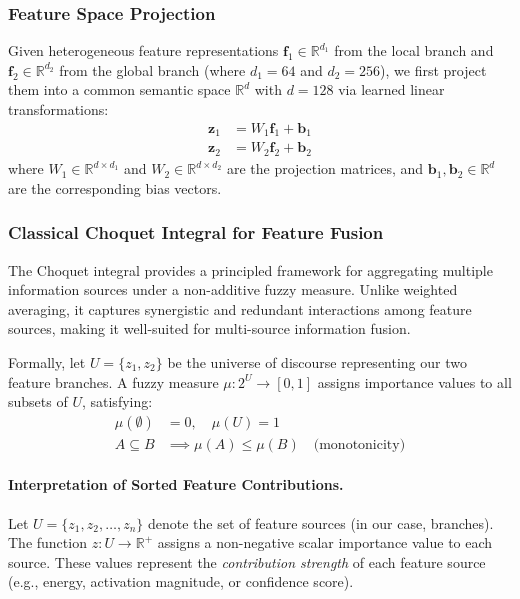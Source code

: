 \documentclass[preprint,12pt]{elsarticle}
\begin{document}
\subsubsection{Feature Space Projection}

Given heterogeneous feature representations $\mathbf{f}_1 \in \mathbb{R}^{d_1}$ from the local branch and $\mathbf{f}_2 \in \mathbb{R}^{d_2}$ from the global branch (where $d_1 = 64$ and $d_2 = 256$), we first project them into a common semantic space $\mathbb{R}^d$ with $d = 128$ via learned linear transformations:
\begin{align*}
    \mathbf{z}_1 &= W_1 \mathbf{f}_1 + \mathbf{b}_1 \\
    \mathbf{z}_2 &= W_2 \mathbf{f}_2 + \mathbf{b}_2
\end{align*}
where $W_1 \in \mathbb{R}^{d \times d_1}$ and $W_2 \in \mathbb{R}^{d \times d_2}$ are the projection matrices, and $\mathbf{b}_1, \mathbf{b}_2 \in \mathbb{R}^d$ are the corresponding bias vectors.

\subsubsection{Classical Choquet Integral for Feature Fusion}

The Choquet integral provides a principled framework for aggregating multiple information sources under a non-additive fuzzy measure. Unlike weighted averaging, it captures synergistic and redundant interactions among feature sources, making it well-suited for multi-source information fusion.

Formally, let $U = \{z_1, z_2\}$ be the universe of discourse representing our two feature branches. A fuzzy measure $\mu: 2^U \rightarrow [0,1]$ assigns importance values to all subsets of $U$, satisfying:
\begin{align*}
    \mu(\emptyset) &= 0, \quad \mu(U) = 1 \\
    A \subseteq B &\implies \mu(A) \leq \mu(B) \quad \text{(monotonicity)}
\end{align*}

\paragraph{Interpretation of Sorted Feature Contributions.}

Let $U = \{z_1, z_2, \ldots, z_n\}$ denote the set of feature sources (in our case, branches). 
The function $z: U \rightarrow \mathbb{R}^+$ assigns a non-negative scalar importance value 
to each source. These values represent the \emph{contribution strength} of each feature source 
(e.g., energy, activation magnitude, or confidence score).
\end{document}
